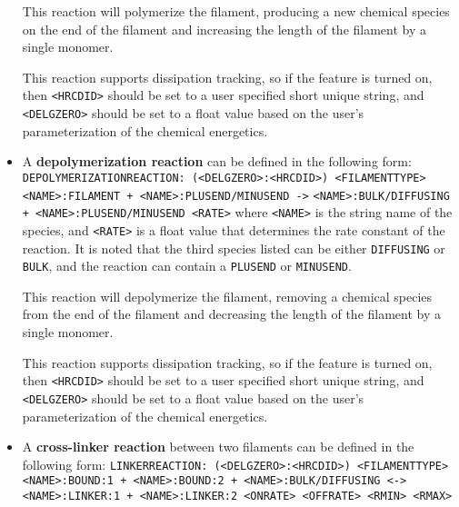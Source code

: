 \documentclass[11pt, oneside]{article}   	%
\begin{document}
\begin{itemize}
	This reaction will polymerize the filament, producing a new chemical species on the end of the filament and increasing 
	the length of the filament by a single monomer.
	
	This reaction supports dissipation tracking, so if the feature is turned on, then \texttt{<HRCDID>} should be set to a user specified short unique string, and \texttt{<DELGZERO>} should be set to a float value based on the user's parameterization of the chemical energetics.
	
	\item A \textbf{depolymerization reaction} can be defined in the following form:\newline\newline
	\texttt{DEPOLYMERIZATIONREACTION: (<DELGZERO>:<HRCDID>) <FILAMENTTYPE>}\newline
	\texttt{<NAME>:FILAMENT + <NAME>:PLUSEND/MINUSEND ->}\newline
	\texttt{<NAME>:BULK/DIFFUSING + <NAME>:PLUSEND/MINUSEND <RATE>}\newline\newline
	where \texttt{<NAME>} is the string name of the species, and \texttt{<RATE>} is a float value that determines the rate constant of the reaction. It is noted that the third species listed can be either \texttt{DIFFUSING} or \texttt{BULK}, and the reaction can contain a \texttt{PLUSEND} or \texttt{MINUSEND}.
	
	This reaction will depolymerize the filament, removing a chemical species from the end of the filament and decreasing the length of the filament by a single monomer.
	
	This reaction supports dissipation tracking, so if the feature is turned on, then \texttt{<HRCDID>} should be set to a user specified short unique string, and \texttt{<DELGZERO>} should be set to a float value based on the user's parameterization of the chemical energetics.
	
	\item A \textbf{cross-linker reaction} between two filaments can be defined in the following form:\newline\newline
	\texttt{LINKERREACTION: (<DELGZERO>:<HRCDID>) <FILAMENTTYPE>}\newline
	\texttt{<NAME>:BOUND:1 + <NAME>:BOUND:2 + <NAME>:BULK/DIFFUSING <->}\newline
	\texttt{<NAME>:LINKER:1 + <NAME>:LINKER:2 <ONRATE> <OFFRATE> <RMIN> <RMAX>}\newline
	

\end{itemize}
\end{document}
